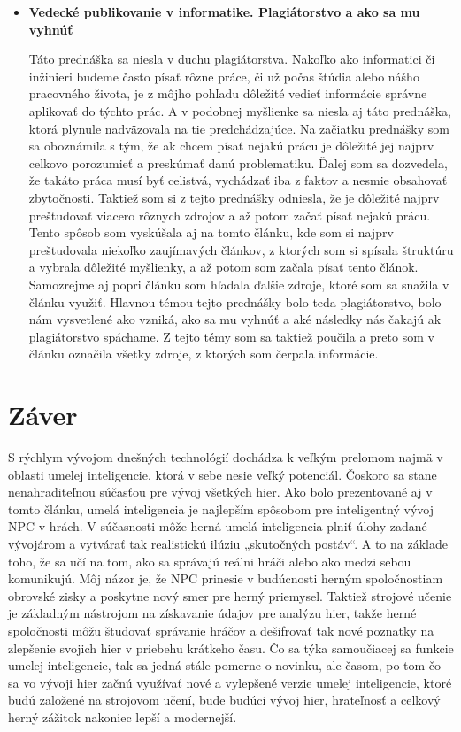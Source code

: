 \documentclass[10pt,twoside,slovak,a4paper]{article}
\begin{document}
\begin{itemize}
\item \textbf{Vedecké publikovanie v informatike. Plagiátorstvo a ako sa mu vyhnúť}

\quad Táto prednáška sa niesla v duchu plagiátorstva. Nakoľko ako informatici či inžinieri budeme často písať rôzne práce, či už počas štúdia alebo nášho pracovného života, je z môjho pohľadu dôležité vedieť informácie správne aplikovať do týchto prác. A v podobnej myšlienke sa niesla aj táto prednáška, ktorá plynule nadväzovala na tie predchádzajúce. Na začiatku prednášky som sa oboznámila s tým, že ak chcem písať nejakú prácu je dôležité jej najprv celkovo porozumieť a preskúmať danú problematiku. Ďalej som sa dozvedela, že takáto práca musí byť celistvá, vychádzať iba z faktov a nesmie obsahovať zbytočnosti. Taktiež som si z tejto prednášky odniesla, že je dôležité najprv preštudovať viacero rôznych zdrojov a až potom začať písať nejakú prácu. Tento spôsob som vyskúšala aj na tomto článku, kde som si najprv preštudovala niekoľko zaujímavých článkov, z ktorých som si spísala štruktúru a vybrala dôležité myšlienky, a až potom som začala písať tento článok. Samozrejme aj popri článku som hľadala ďalšie zdroje, ktoré som sa snažila v článku využiť. Hlavnou témou tejto prednášky bolo teda plagiátorstvo, bolo nám vysvetlené ako vzniká, ako sa mu vyhnúť a aké následky nás čakajú ak plagiátorstvo spáchame. Z tejto témy som sa taktiež poučila a preto som v článku označila všetky zdroje, z ktorých som čerpala informácie.  

\end{itemize}

\section{Záver} \label{zaver} 
\quad S rýchlym vývojom dnešných technológií dochádza k veľkým prelomom najmä v oblasti umelej inteligencie, ktorá v sebe nesie veľký potenciál. Čoskoro sa stane nenahraditeľnou súčasťou pre vývoj všetkých hier. Ako bolo prezentované aj v tomto článku, umelá inteligencia je najlepším spôsobom pre inteligentný vývoj NPC v hrách. V súčasnosti môže herná umelá inteligencia plniť úlohy zadané vývojárom a vytvárať tak realistickú ilúziu „skutočných postáv“. A to na základe toho, že sa učí na tom, ako sa správajú reálni hráči alebo ako medzi sebou komunikujú. Môj názor je, že NPC prinesie v budúcnosti herným spoločnostiam obrovské zisky a poskytne nový smer pre herný priemysel. Taktiež strojové učenie je základným nástrojom na získavanie údajov pre analýzu hier, takže herné spoločnosti môžu študovať správanie hráčov a dešifrovať tak nové poznatky na zlepšenie svojich hier v priebehu krátkeho času. Čo sa týka samoučiacej sa funkcie umelej inteligencie, tak sa jedná stále pomerne o novinku, ale časom, po tom čo sa vo vývoji hier začnú využívať nové a vylepšené verzie umelej inteligencie, ktoré budú založené na strojovom učení, bude budúci vývoj hier, hrateľnosť a celkový herný zážitok nakoniec lepší a modernejší.
\end{document}
